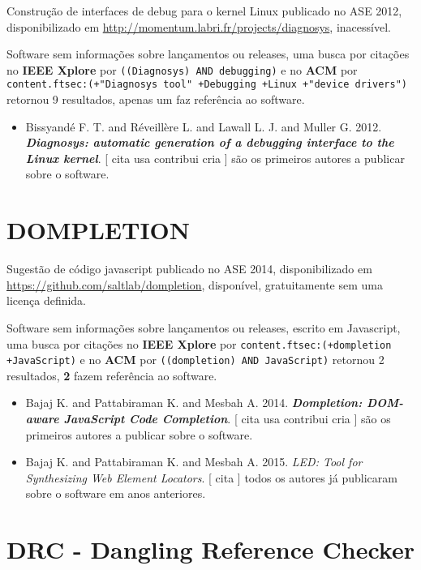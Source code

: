 Construção de interfaces de debug para o kernel Linux
publicado no ASE 2012,
disponibilizado em \url{http://momentum.labri.fr/projects/diagnosys},
inacessível.

Software sem informações sobre lançamentos ou releases,
uma busca por citações no {\bf IEEE Xplore} por
\texttt{((Diagnosys) AND debugging)}
e no {\bf ACM} por
\texttt{content.ftsec:(+"Diagnosys tool" +Debugging +Linux +"device drivers")}
retornou
9 resultados,
apenas um faz referência ao software.

\begin{itemize}
\item Bissyandé F. T. and Réveillère L. and Lawall L. J. and Muller G.
      2012.
        \textbf{\textit{ Diagnosys: automatic generation of a debugging interface to the Linux kernel}}.
      [
          cita
          usa
          contribui
          cria
      ]
são os primeiros autores a publicar sobre o software.
\end{itemize}
\section{DOMPLETION}

Sugestão de código javascript
publicado no ASE 2014,
disponibilizado em \url{https://github.com/saltlab/dompletion},
disponível,
gratuitamente
sem uma licença definida.

Software sem informações sobre lançamentos ou releases,
escrito em Javascript,
uma busca por citações no {\bf IEEE Xplore} por
\texttt{content.ftsec:(+dompletion +JavaScript)}
e no {\bf ACM} por
\texttt{((dompletion) AND JavaScript)}
retornou
2 resultados,
{\bf 2} fazem referência ao software.

\begin{itemize}
\item Bajaj K. and Pattabiraman K. and Mesbah A.
      2014.
        \textbf{\textit{ Dompletion: DOM-aware JavaScript Code Completion}}.
      [
          cita
          usa
          contribui
          cria
      ]
são os primeiros autores a publicar sobre o software.
\item Bajaj K. and Pattabiraman K. and Mesbah A.
      2015.
        \textit{ LED: Tool for Synthesizing Web Element Locators}.
      [
          cita
      ]
todos os autores já publicaram sobre o software em anos anteriores.
\end{itemize}
\section{DRC - Dangling Reference Checker}


